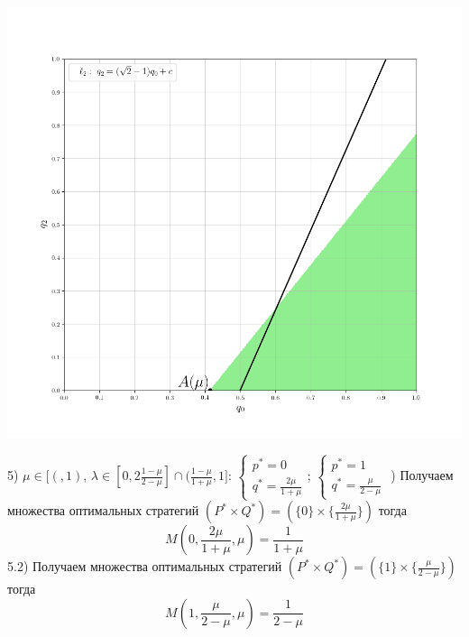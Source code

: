 \documentclass[letterpaper,12pt, reqno]{article}
\begin{document}
\begin{flushleft}
\begin{center}
\includegraphics[scale=0.5]{graf_3_5}
\end{center}
5) $\mu \in [(, 1)$, $\lambda \in [0, 2\frac{1-\mu}{2-\mu}]\cap(\frac{1-\mu}{1+\mu}, 1]$: 
$\begin{cases}p^{*}=0 \\ q^{*}=\frac{2\mu}{1+\mu} \end{cases}$;
$\begin{cases}p^{*}=1 \\ q^{*}=\frac{\mu}{2-\mu} \end{cases}$
\hfill {}) Получаем множества оптимальных стратегий 
$(P^{*} \times Q^{*}) =(\{0\} \times \{\frac{2\mu}{1+\mu}\})$ тогда
$$M(0, \frac{2\mu}{1+\mu},\mu)=\frac{1}{1+\mu}$$
5.2) Получаем множества оптимальных стратегий 
$(P^{*} \times Q^{*}) =(\{1\}\times \{\frac{\mu}{2-\mu}\})$ тогда
$$M(1, \frac{\mu}{2-\mu},\mu)=\frac{1}{2-\mu}$$


\end{flushleft}
\end{document}

